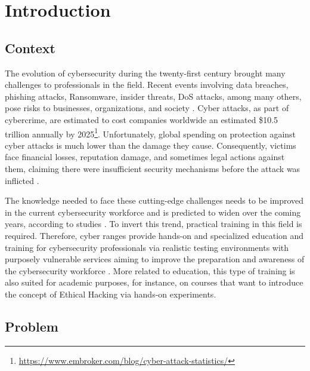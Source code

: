 \chapter{Introduction} \label{chap:intro}

\minitoc

\section{Context} \label{sec:context}

The evolution of cybersecurity during the twenty-first century brought many challenges to professionals in the field. Recent events involving data breaches, phishing attacks, Ransomware, insider threats, DoS attacks, among many others, pose risks to businesses, organizations, and society \citep{cyber_warfare_ref}. Cyber attacks, as part of cybercrime, are estimated to cost companies worldwide an estimated \$10.5 trillion annually by 2025\footnote{\url{https://www.embroker.com/blog/cyber-attack-statistics/}}. Unfortunately, global spending on protection against cyber attacks is much lower than the damage they cause. Consequently, victims face financial losses, reputation damage, and sometimes legal actions against them, claiming there were insufficient security mechanisms before the attack was inflicted \citep{cyber_challenges_ref}.

The knowledge needed to face these cutting-edge challenges needs to be improved in the current cybersecurity workforce and is predicted to widen over the coming years, according to studies \citep{cyber_range_nist_reg}. To invert this trend, practical training in this field is required. Therefore, cyber ranges provide hands-on and specialized education and training for cybersecurity professionals via realistic testing environments with purposely vulnerable services aiming to improve the preparation and awareness of the cybersecurity workforce \citep{cr_and_security_testbeds_ref, leaf_ref}. More related to education, this type of training is also suited for academic purposes, for instance, on courses that want to introduce the concept of Ethical Hacking via hands-on experiments.

\section{Problem} \label{sec:problem}

